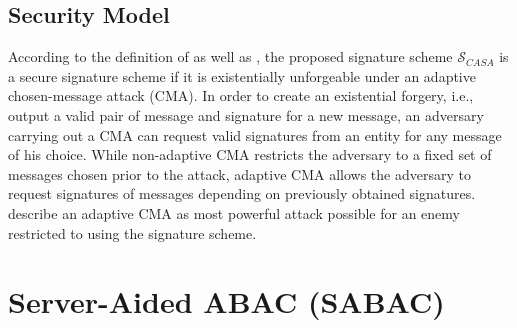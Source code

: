 \subsection{Security Model}
According to the definition of \citeauthor{Boneh2023} \cite{Boneh2023} as well as \citeauthor{Goldwasser1988} \cite{Goldwasser1988}, the proposed signature scheme $\mathcal{S}_{CASA}$ is a secure signature scheme if it is existentially unforgeable under an adaptive chosen-message attack (CMA).
In order to create an existential forgery, i.e., output a valid pair of message and signature for a new message, an adversary carrying out a CMA can request valid signatures from an entity for any message of his choice.
While non-adaptive CMA restricts the adversary to a fixed set of messages chosen prior to the attack, adaptive CMA allows the adversary to request signatures of messages depending on previously obtained signatures.
\citeauthor{Goldwasser1988} describe an adaptive CMA as most powerful attack possible for an enemy restricted to using the signature scheme.

\section{Server-Aided ABAC (SABAC)}
\label{sec:approach:sabac}


